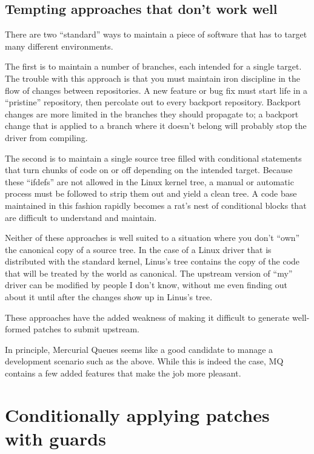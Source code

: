 \subsection{Tempting approaches that don't work well}

There are two ``standard'' ways to maintain a piece of software that
has to target many different environments.

The first is to maintain a number of branches, each intended for a
single target.  The trouble with this approach is that you must
maintain iron discipline in the flow of changes between repositories.
A new feature or bug fix must start life in a ``pristine'' repository,
then percolate out to every backport repository.  Backport changes are
more limited in the branches they should propagate to; a backport
change that is applied to a branch where it doesn't belong will
probably stop the driver from compiling.

The second is to maintain a single source tree filled with conditional
statements that turn chunks of code on or off depending on the
intended target.  Because these ``ifdefs'' are not allowed in the
Linux kernel tree, a manual or automatic process must be followed to
strip them out and yield a clean tree.  A code base maintained in this
fashion rapidly becomes a rat's nest of conditional blocks that are
difficult to understand and maintain.

Neither of these approaches is well suited to a situation where you
don't ``own'' the canonical copy of a source tree.  In the case of a
Linux driver that is distributed with the standard kernel, Linus's
tree contains the copy of the code that will be treated by the world
as canonical.  The upstream version of ``my'' driver can be modified
by people I don't know, without me even finding out about it until
after the changes show up in Linus's tree.  

These approaches have the added weakness of making it difficult to
generate well-formed patches to submit upstream.

In principle, Mercurial Queues seems like a good candidate to manage a
development scenario such as the above.  While this is indeed the
case, MQ contains a few added features that make the job more
pleasant.

\section{Conditionally applying patches with guards}

